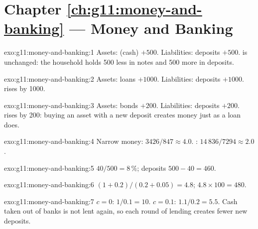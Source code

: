 \section*{Chapter \ref{ch:g11:money-and-banking} --- Money and Banking}

\begin{solution}{exo:g11:money-and-banking:1}
Assets:  (cash) $+500$. Liabilities: deposits $+500$.  is unchanged: the household holds 500 less in notes and 500 more in deposits.
\end{solution}

\begin{solution}{exo:g11:money-and-banking:2}
Assets: loans $+1000$. Liabilities: deposits $+1000$.  rises by 1000.
\end{solution}

\begin{solution}{exo:g11:money-and-banking:3}
Assets: bonds $+200$. Liabilities: deposits $+200$.  rises by 200: buying an asset with a new deposit creates money just as a loan does.
\end{solution}

\begin{solution}{exo:g11:money-and-banking:4}
Narrow money: $3426/847 \approx 4.0$. : $14\,836/7294 \approx 2.0$.
\end{solution}

\begin{solution}{exo:g11:money-and-banking:5}
$40/500 = 8\,\%$; deposits $500 - 40 = 460$.
\end{solution}

\begin{solution}{exo:g11:money-and-banking:6}
$(1 + 0.2)/(0.2 + 0.05) = 4.8$;  $4.8 \times 100 = 480$.
\end{solution}

\begin{solution}{exo:g11:money-and-banking:7}
$c = 0$: $1/0.1 = 10$. $c = 0.1$: $1.1/0.2 = 5.5$. Cash taken out of banks is not lent again, so each round of lending creates fewer new deposits.
\end{solution}

